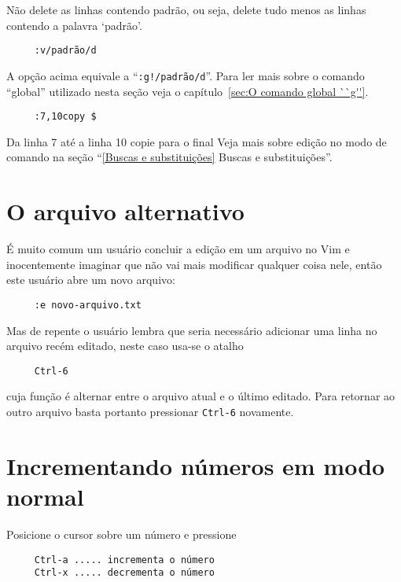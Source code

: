 Não delete as linhas contendo padrão, ou seja, delete tudo menos as linhas
contendo a palavra `padrão'. 

\begin{verbatim}
     :v/padrão/d
\end{verbatim}

A opção acima equivale a ``\verb+:g!/padrão/d+''.  Para ler mais sobre
o comando ``global'' utilizado nesta seção veja o capítulo~\ref{sec:O comando global ``g''}.

\begin{verbatim}
     :7,10copy $
\end{verbatim}

Da linha 7 até a linha 10 copie para o final
Veja mais sobre edição no modo de comando na seção ``\ref{Buscas e
substituições} Buscas e substituições''.

\section{O arquivo alternativo}
\label{O arquivo alternativo}

É muito comum um usuário concluir a edição em um arquivo no Vim e
inocentemente imaginar que não vai mais modificar qualquer coisa nele, então
este usuário abre um novo arquivo:

\begin{verbatim}
     :e novo-arquivo.txt
\end{verbatim}

Mas de repente o usuário lembra que seria necessário adicionar uma linha no
arquivo recém editado, neste caso usa-se o atalho

\begin{verbatim}
     Ctrl-6
\end{verbatim}

cuja função é alternar entre o arquivo atual e o último editado. Para retornar
ao outro arquivo basta portanto pressionar \verb|Ctrl-6| novamente.

\section{Incrementando números em modo normal}\label{Incrementando números em modo normal}
Posicione o cursor sobre um número e pressione

\begin{verbatim}
     Ctrl-a ..... incrementa o número
     Ctrl-x ..... decrementa o número
\end{verbatim}

